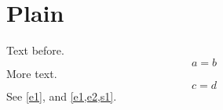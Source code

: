\documentclass{article}
\begin{document}
\section{Plain}\label{s1}
Text before.
\begin{equation}\label{e1}
a = b
\end{equation}
More text.
\begin{equation}
c = d \label{e2}
\end{equation}
See \cref{e1},  and \cref{e1,e2,s1}.
\end{document}
